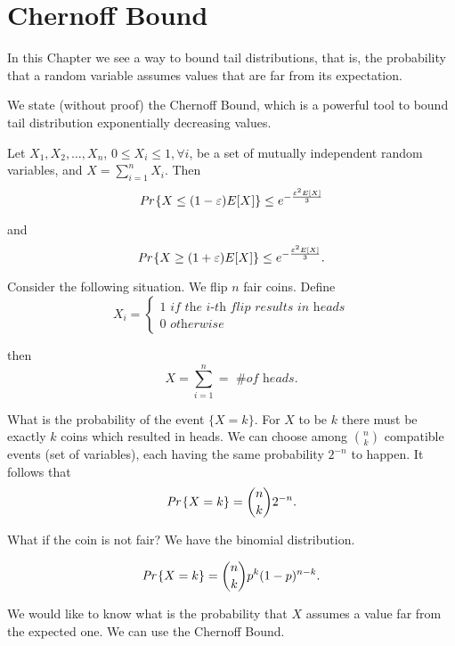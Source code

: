 \chapter{Chernoff Bound}

In this Chapter we see a way to bound tail distributions, that is, the probability that a random variable assumes values that are far from its expectation.

We state (without proof) the Chernoff Bound, which is a powerful tool to bound tail distribution exponentially decreasing values.
\begin{thm}
	Let $X_1, X_2, \ldots, X_n$, $0 \leq X_i \leq 1,\forall i$, be a set of mutually independent random variables, and $X = \sum_{i=1}^nX_i$. Then
	\begin{equation}
	\emph{Pr}\left\{X \leq (1-\varepsilon)E[X]\right\} \leq e^{-\frac{\varepsilon^2E[X]}{3}}
	\end{equation}
	
	and
	\begin{equation}
	\emph{Pr}\left\{X \geq (1+\varepsilon)E[X]\right\} \leq e^{-\frac{\varepsilon^2E[X]}{3}}.
	\end{equation}
\end{thm}

Consider the following situation. We flip $n$ fair coins. Define
\[X_i = \begin{cases}1 \textit{ if the i-th flip results in heads}\\0 \textit{ otherwise}\end{cases}\]

then 
\[X = \sum_{i=1}^n = \textit{ \# of heads}.\] 

What is the probability of the event $\{X = k\}$. For $X$ to be $k$ there must be exactly $k$ coins which resulted in heads. We can choose among $\binom{n}{k}$ compatible events (set of variables), each having the same probability $2^{-n}$ to happen. It follows that
\begin{equation*}
	\emph{Pr}\left\{X = k\right\} = \binom{n}{k}2^{-n}.
\end{equation*} 

What if the coin is not fair? We have the binomial distribution.

\begin{equation}
	\emph{Pr}\left\{X = k\right\} = \binom{n}{k} p^k(1-p)^{n-k}.
\end{equation}

We would like to know what is the probability that $X$ assumes a value far from the expected one. We can use the Chernoff Bound.

